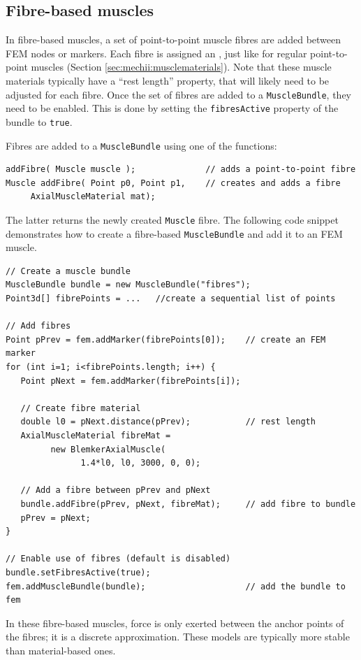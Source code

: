 \subsection{Fibre-based muscles}
\label{sec:fem:fibremuscle}

In fibre-based muscles, a set of point-to-point muscle fibres are added between
FEM nodes or markers.  Each fibre is assigned an 
, just like for 
regular point-to-point muscles (Section \ref{sec:mechii:musclematerials}).  Note
that these muscle materials typically have a ``rest length'' property, that will
likely need to be adjusted for each fibre.  Once the set of fibres are added
to a {\tt MuscleBundle}, they need to be enabled.  This is done by setting
the {\tt fibresActive} property of the bundle to {\tt true}.

Fibres are added to a {\tt MuscleBundle} using one of the functions:
\begin{lstlisting}[]
addFibre( Muscle muscle );              // adds a point-to-point fibre
Muscle addFibre( Point p0, Point p1,    // creates and adds a fibre
	 AxialMuscleMaterial mat);
\end{lstlisting}
The latter returns the newly created {\tt Muscle} fibre.  
The following code snippet demonstrates how to create a fibre-based 
{\tt MuscleBundle} and add it to an FEM muscle.
\lstset{numbers=left}
\begin{lstlisting}[]
// Create a muscle bundle
MuscleBundle bundle = new MuscleBundle("fibres");
Point3d[] fibrePoints = ...   //create a sequential list of points

// Add fibres
Point pPrev = fem.addMarker(fibrePoints[0]);    // create an FEM marker
for (int i=1; i<fibrePoints.length; i++) {
   Point pNext = fem.addMarker(fibrePoints[i]);

   // Create fibre material
   double l0 = pNext.distance(pPrev);           // rest length
   AxialMuscleMaterial fibreMat = 
         new BlemkerAxialMuscle(
               1.4*l0, l0, 3000, 0, 0);

   // Add a fibre between pPrev and pNext
   bundle.addFibre(pPrev, pNext, fibreMat);     // add fibre to bundle
   pPrev = pNext;
}

// Enable use of fibres (default is disabled)
bundle.setFibresActive(true);
fem.addMuscleBundle(bundle);                    // add the bundle to fem
\end{lstlisting}
\lstset{numbers=none}

In these fibre-based muscles, force is only exerted between the anchor
points of the fibres; it is a discrete approximation.  These models
are typically more stable than material-based ones.

